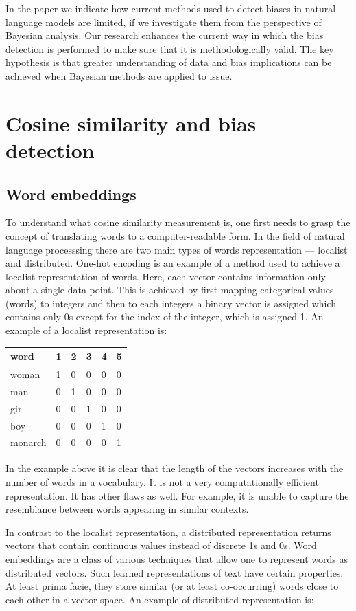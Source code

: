 \documentclass[12pt,]{book}
\begin{document}
In the paper we indicate how current methods used to detect biases in
natural language models are limited, if we investigate them from the
perspective of Bayesian analysis. Our research enhances the current way
in which the bias detection is performed to make sure that it is
methodologically valid. The key hypothesis is that greater understanding
of data and bias implications can be achieved when Bayesian methods are
applied to issue.

\chapter{Cosine similarity and bias
detection}\label{cosine-similarity-and-bias-detection}

\section{Word embeddings}\label{word-embeddings}

To understand what cosine similarity measurement is, one first needs to
grasp the concept of translating words to a computer-readable form. In
the field of natural language processsing there are two main types of
words representation --- localist and distributed. One-hot encoding is
an example of a method used to achieve a localist representation of
words. Here, each vector contains information only about a single data
point. This is achieved by first mapping categorical values (words) to
integers and then to each integers a binary vector is assigned which
contains only 0s except for the index of the integer, which is assigned
1. An example of a localist representation is:

\begin{longtable}[]{@{}llllll@{}}
\toprule
word & 1 & 2 & 3 & 4 & 5\tabularnewline
\midrule
\endhead
woman & 1 & 0 & 0 & 0 & 0\tabularnewline
man & 0 & 1 & 0 & 0 & 0\tabularnewline
girl & 0 & 0 & 1 & 0 & 0\tabularnewline
boy & 0 & 0 & 0 & 1 & 0\tabularnewline
monarch & 0 & 0 & 0 & 0 & 1\tabularnewline
\bottomrule
\end{longtable}

In the example above it is clear that the length of the vectors
increases with the number of words in a vocabulary. It is not a very
computationally efficient representation. It has other flaws as well.
For example, it is unable to capture the resemblance between words
appearing in similar contexts.

In contrast to the localist representation, a distributed representation
returns vectors that contain continuous values instead of discrete 1s
and 0s. Word embeddings are a class of various techniques that allow one
to represent words as distributed vectors. Such learned representations
of text have certain properties. At least prima facie, they store
similar (or at least co-occurring) words close to each other in a vector
space. An example of distributed representation is:
\end{document}
